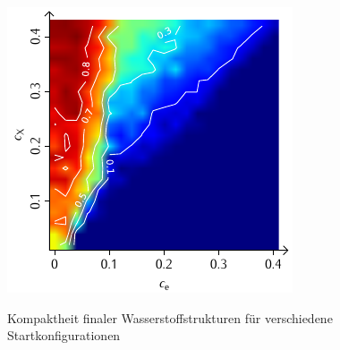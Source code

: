 \documentclass[a4paper, 10pt, twoside, openany]{book} %
\begin{document}
\begin{figure}
\begin{minipage}[t]{0.48\textwidth}
			\label{H_individual_K}
		\end{minipage}
		\hfill
		\begin{minipage}[t]{0.48\textwidth}
			\includegraphics[width=\textwidth]{Abbildungen/Phasendiagramme/Konturen/H_penalty_individual_K.pdf}
			\label{H_penalty_individual_K}
		\end{minipage}
		\caption[Kompaktheit finaler Wasserstoffstrukturen]{Kompaktheit finaler Wasserstoffstrukturen für verschiedene Startkonfigurationen}
		\label{H_K}
	\end{figure}
	
\end{document}
